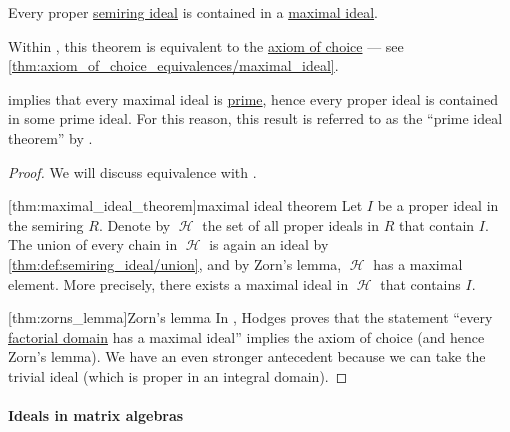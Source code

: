 \begin{theorem}\label{thm:maximal_ideal_theorem}
  Every proper \hyperref[def:semiring_ideal]{semiring ideal} is contained in a \hyperref[def:semiring_ideal/maximal]{maximal ideal}.
\end{theorem}
\begin{comments}
  \item Within \hyperref[def:zfc]{}, this theorem is equivalent to the \hyperref[def:zfc/choice]{axiom of choice} --- see \cref{thm:axiom_of_choice_equivalences/maximal_ideal}.

  \item {} implies that every maximal ideal is \hyperref[def:semiring_ideal/prime]{prime}, hence every proper ideal is contained in some prime ideal. For this reason, this result is referred to as the \enquote{prime ideal theorem} by \textcite{Johnstone1983PointlessTopology}.
\end{comments}
\begin{proof}
  We will discuss equivalence with .

  [thm:maximal_ideal_theorem]{maximal ideal theorem} Let \( I \) be a proper ideal in the semiring \( R \). Denote by \( \mscrH \) the set of all proper ideals in \( R \) that contain \( I \). The union of every chain in \( \mscrH \) is again an ideal by \cref{thm:def:semiring_ideal/union}, and by Zorn's lemma, \( \mscrH \) has a maximal element. More precisely, there exists a maximal ideal in \( \mscrH \) that contains \( I \).

  [thm:zorns_lemma]{Zorn's lemma} In \cite{Hodges1979KrullImpliesZorn}, Hodges proves that the statement \enquote{every \hyperref[def:factorial_domain]{factorial domain} has a maximal ideal} implies the axiom of choice (and hence Zorn's lemma). We have an even stronger antecedent because we can take the trivial ideal (which is proper in an integral domain).
\end{proof}

\paragraph{Ideals in matrix algebras}

